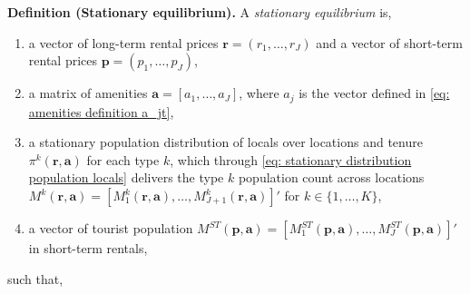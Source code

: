 \documentclass[11pt]{article}
\newcommand{\Paragraph}{\vspace{0.1cm}\noindent\textbf}
\begin{document}
\Paragraph{Definition (Stationary equilibrium).} A \emph{stationary equilibrium} is,
\begin{enumerate}
    \item a vector of long-term rental prices $\mathbf{r}=(r_1,\dots,r_J)$ and a vector of short-term rental prices $\mathbf{p}=(p_1,\dots,p_J)$,
    \item a matrix of amenities $\mathbf{a}=[a_1,\dots,a_J]$, where $a_j$ is the vector defined in \ref{eq: amenities definition a_jt},
    \item a stationary population distribution of locals over locations and tenure $\pi^k(\mathbf{r}, \mathbf{a})$ for each type $k$, which through \ref{eq: stationary distribution population locals} delivers the type $k$ population count across locations $M^k(\mathbf{r}, \mathbf{a}) = [M_1^k(\mathbf{r}, \mathbf{a}),\dots,M_{J+1}^k(\mathbf{r}, \mathbf{a})]'$ for $k \in \{1, \dots, K\}$,
    \item a vector of tourist population $M^{ST}(\mathbf{p}, \mathbf{a})=[M_1^{ST}(\mathbf{p}, \mathbf{a}),\dots, M_{J}^{ST}(\mathbf{p}, \mathbf{a})]'$ in short-term rentals,
\end{enumerate}
such that,
\end{document}
